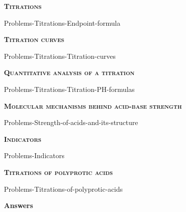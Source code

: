 \documentclass[main.tex]{subfiles}
\newcommand\chapterlabel{Ch-acidbase}
\begin{document}
\begin{multicols*}{2}
{\raggedright\textsc{\textbf{Titrations}}\par}
 {Problems-Titrations-Endpoint-formula}
 
 {\raggedright\textsc{\textbf{Titration curves}}\par}
 {Problems-Titrations-Titration-curves}
 {\raggedright\textsc{\textbf{Quantitative analysis of a titration}}\par}
 {Problems-Titrations-Titration-PH-formulas} 
 {\raggedright\textsc{\textbf{Molecular mechanisms behind acid-base strength}}\par} 
 {Problems-Strength-of-acids-and-its-structure} 
 {\raggedright\textsc{\textbf{Indicators}}\par} 
 {Problems-Indicators} 
{\raggedright\textsc{\textbf{Titrations of polyprotic acids}}\par} 
 {Problems-Titrations-of-polyprotic-acids} 

\end{multicols*}


\newpage \begin{answerbox}
\begin{answersenvironment}
 \begin{localsize}{10}
{\Large \bf Answers}
\printsolutions 
 \end{localsize}
 \end{answersenvironment}
\end{answerbox}
\end{document}
